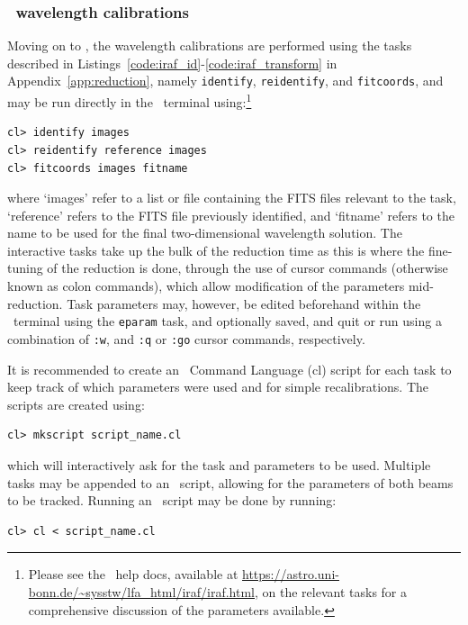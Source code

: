 \subsubsection{\iraf\ wavelength calibrations}

Moving on to \iraf, the wavelength calibrations are performed using the tasks described in Listings~\ref{code:iraf_id}-\ref{code:iraf_transform} in Appendix~\ref{app:reduction}, namely \texttt{identify}, \texttt{reidentify}, and \texttt{fitcoords}, and may be run directly in the \iraf\ terminal using:\footnote{Please see the \iraf\ help docs, available at \url{https://astro.uni-bonn.de/~sysstw/lfa_html/iraf/iraf.html}, on the relevant tasks for a comprehensive discussion of the parameters available.}

\begin{verbatim}
cl> identify images
cl> reidentify reference images
cl> fitcoords images fitname
\end{verbatim}

\noindent where `images' refer to a list or file containing the \gls{FITS} files relevant to the task, `reference' refers to the \gls{FITS} file previously identified, and `fitname' refers to the name to be used for the final two-dimensional wavelength solution. The interactive tasks take up the bulk of the reduction time as this is where the fine-tuning of the reduction is done, through the use of cursor commands (otherwise known as colon commands), which allow modification of the parameters mid-reduction. Task parameters may, however, be edited beforehand within the \iraf\ terminal using the \texttt{eparam} task, and optionally saved, and quit or run using a combination of \texttt{:w}, and \texttt{:q} or \texttt{:go} cursor commands, respectively.

It is recommended to create an \iraf\ Command Language (cl) script for each task to keep track of which parameters were used and for simple recalibrations. The scripts are created using:

\begin{verbatim}cl> mkscript script_name.cl\end{verbatim}

\noindent which will interactively ask for the task and parameters to be used. Multiple tasks may be appended to an \iraf\ script, allowing for the parameters of both beams to be tracked. Running an \iraf\ script may be done by running:

\begin{verbatim}cl> cl < script_name.cl\end{verbatim}

